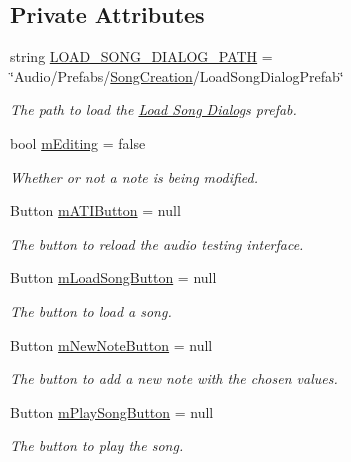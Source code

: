 \subsection*{Private Attributes}
\begin{DoxyCompactItemize}
\item 
string \hyperlink{class_song_creation_a1e30986ba2a7d3329425b160d54b3dc7}{L\+O\+A\+D\+\_\+\+S\+O\+N\+G\+\_\+\+D\+I\+A\+L\+O\+G\+\_\+\+P\+A\+TH} = \char`\"{}Audio/Prefabs/\hyperlink{class_song_creation}{Song\+Creation}/Load\+Song\+Dialog\+Prefab\char`\"{}
\begin{DoxyCompactList}\small\item\em The path to load the \hyperlink{}{Load Song Dialog}\textquotesingle{}s prefab. \end{DoxyCompactList}\item 
bool \hyperlink{group___s_c_priv_var_ga5aec1c6ae4159b96ce466ee6b1da3371}{m\+Editing} = false
\begin{DoxyCompactList}\small\item\em Whether or not a note is being modified. \end{DoxyCompactList}\item 
Button \hyperlink{group___s_c_priv_var_gacc018689b7f6508762958c3796a68937}{m\+A\+T\+I\+Button} = null
\begin{DoxyCompactList}\small\item\em The button to reload the audio testing interface. \end{DoxyCompactList}\item 
Button \hyperlink{group___s_c_priv_var_ga0e016451dff405f570bf530586fb36fa}{m\+Load\+Song\+Button} = null
\begin{DoxyCompactList}\small\item\em The button to load a song. \end{DoxyCompactList}\item 
Button \hyperlink{group___s_c_priv_var_ga488ce0727c77abe7c84989241f4e55b4}{m\+New\+Note\+Button} = null
\begin{DoxyCompactList}\small\item\em The button to add a new note with the chosen values. \end{DoxyCompactList}\item 
Button \hyperlink{group___s_c_priv_var_ga8afebf9e2e92619f9ef9cfe5410a143a}{m\+Play\+Song\+Button} = null
\begin{DoxyCompactList}\small\item\em The button to play the song. \end{DoxyCompactList}\item 

\end{DoxyCompactItemize}
